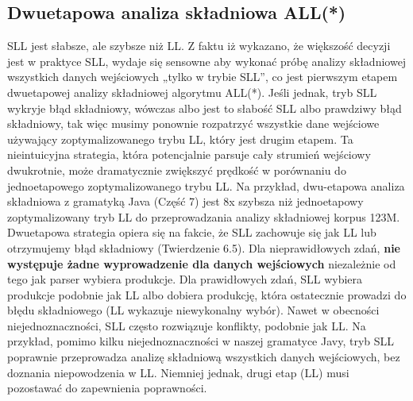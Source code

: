 ﻿\subsection{Dwuetapowa analiza składniowa ALL(*)}
SLL jest słabsze, ale szybsze niż LL.
Z faktu iż wykazano, że większość decyzji jest w praktyce SLL, wydaje się
sensowne aby wykonać próbę analizy składniowej wszystkich danych wejściowych
„tylko w trybie SLL”, co jest pierwszym etapem dwuetapowej analizy składniowej algorytmu ALL(*).
Jeśli jednak, tryb SLL wykryje błąd składniowy, wówczas albo jest to słabość SLL
albo prawdziwy błąd składniowy, tak więc musimy ponownie rozpatrzyć wszystkie
dane wejściowe używający zoptymalizowanego trybu LL, który jest drugim etapem.
Ta nieintuicyjna strategia, która potencjalnie parsuje cały strumień wejściowy dwukrotnie,
może dramatycznie zwiększyć prędkość w porównaniu do jednoetapowego zoptymalizowanego trybu LL.
Na przykład, dwu-etapowa analiza składniowa z gramatyką Java (Część 7) jest 8x szybsza
niż jednoetapowy zoptymalizowany tryb LL do przeprowadzania analizy składniowej korpus 123M.
Dwuetapowa strategia opiera się na fakcie, że SLL zachowuje się jak LL
lub otrzymujemy błąd składniowy (Twierdzenie 6.5).
Dla nieprawidłowych zdań, \textbf{nie występuje żadne wyprowadzenie dla danych
wejściowych} niezależnie od tego jak parser wybiera produkcje.
Dla prawidłowych zdań, SLL wybiera produkcje podobnie jak LL albo dobiera produkcję,
która ostatecznie prowadzi do błędu składniowego (LL wykazuje niewykonalny wybór).
Nawet w obecności niejednoznaczności, SLL często rozwiązuje konflikty, podobnie jak LL.
Na przykład, pomimo kilku niejednoznaczności w naszej gramatyce Javy, tryb SLL
poprawnie przeprowadza analizę składniową wszystkich danych wejściowych,
bez doznania niepowodzenia w LL. Niemniej jednak,
drugi etap (LL) musi pozostawać do zapewnienia poprawności.
